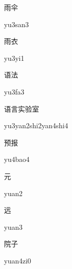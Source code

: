 \begin{verbete}[yu3san3]{雨伞}
\begin{pronuncia}{yu3san3}
\end{pronuncia}
\end{verbete}

\begin{verbete}[yu3yi1]{雨衣}
\begin{pronuncia}{yu3yi1}
\end{pronuncia}
\end{verbete}

\begin{verbete}[yu3fa3]{语法}
\begin{pronuncia}{yu3fa3}
\end{pronuncia}
\end{verbete}

\begin{verbete}{语言实验室}
\begin{pronuncia}[\\]{yu3yan2shi2yan4shi4}
\end{pronuncia}
\end{verbete}

\begin{verbete}[yu4bao4]{预报}
\begin{pronuncia}{yu4bao4}
\end{pronuncia}
\end{verbete}

\begin{verbete}[yuan2]{元}
\begin{pronuncia}{yuan2}
\end{pronuncia}
\end{verbete}

\begin{verbete}[yuan3]{远}
\begin{pronuncia}{yuan3}
\end{pronuncia}
\end{verbete}

\begin{verbete}[yuan4zi0]{院子}
\begin{pronuncia}{yuan4zi0}
\end{pronuncia}
\end{verbete}

